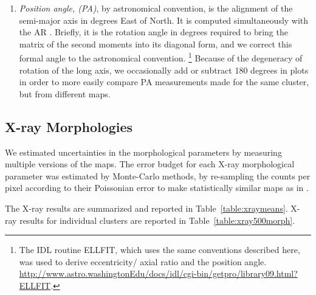 \documentclass[iop,twocolumn]{emulateapj}
\begin{document}
{\begin{enumerate}
\item {\it Position angle, (PA)}, by astronomical convention, 
is the alignment of the semi-major axis in degrees East of North. It is computed simultaneously with the AR \citep{2015ApJ...805..177D}.
Briefly, it is the rotation angle in degrees required to bring the matrix of the second moments into
its diagonal form, and we correct this formal angle to the astronomical convention. 
\footnote{ The IDL routine ELLFIT, which uses the same conventions described here, 
was used to derive eccentricity/ axial ratio and the position angle. 
\url{http://www.astro.washingtonEdu/docs/idl/cgi-bin/getpro/library09.html?ELLFIT}.  }
Because of the degeneracy of rotation of the long axis, we occasionally add or subtract 180 degrees in plots in order to
more easily compare PA measurements made for the same cluster, but from different maps.
\end{enumerate}

\subsection{X-ray Morphologies \label{section:Xraymorph}}



We estimated uncertainties in the morphological parameters by measuring multiple versions of the maps.
The error budget for each X-ray morphological parameter was estimated by Monte-Carlo methods, 
by re-sampling the counts per pixel according to their Poissonian error to make statistically similar maps as 
in \citep{2010ApJ...721L..82C}. 

The X-ray results are summarized and reported in Table~\ref{table:xraymeans}. 
X-ray results for individual clusters are
reported in Table~\ref{table:xray500morph}.

}
\end{document}
